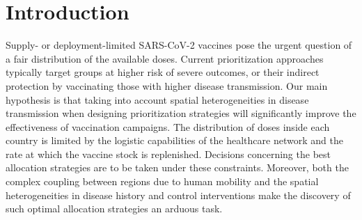 
\section{Introduction}
Supply- or deployment-limited SARS-CoV-2 vaccines\cite[-2\baselineskip]{Khamsi:IfCoronavirusVaccine:2020} pose the urgent question of a fair distribution of the available doses\cite[-1\baselineskip]{NationalAcademiesofSciencesEngineeringandMedicine:FrameworkEquitableAllocation:2020}. Current prioritization approaches typically target groups at higher risk of severe outcomes\cite{Spassiani:VaccinationCriteriaBased:2020, Matrajt:VaccineOptimizationCOVID19:2020a}, or their indirect protection by vaccinating those with higher disease transmission\cite{%
Gallagher:IndirectBenefitsAre:2021,Tuite:AlternativeDoseAllocation:2021}. Our main hypothesis is that taking into account spatial heterogeneities in disease transmission when designing prioritization strategies will significantly improve the effectiveness of vaccination campaigns.
The distribution of doses inside each country is limited by the logistic capabilities of the healthcare network and the rate at which the vaccine stock is replenished. Decisions concerning the best allocation strategies are to be taken under these constraints. Moreover, both the complex coupling between regions due to human mobility and the spatial heterogeneities in disease history and control interventions make the discovery of such optimal allocation strategies an arduous task.


